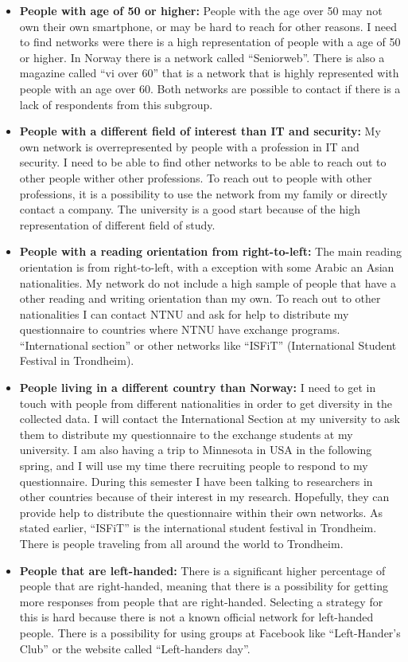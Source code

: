     \begin{itemize}
      \item {\bf People with age of 50 or higher:} People with the age over 50 may not own their own smartphone, or may be hard to reach for other reasons. I need to find networks were there is a high representation of people with a age of 50 or higher. In Norway there is a network called ``Seniorweb''. There is also a magazine called ``vi over 60'' that is a network that is highly represented with people with an age over 60. Both networks are possible to contact if there is a lack of respondents from this subgroup. 
      \item {\bf People with a different field of interest than IT and security:} My own network is overrepresented by people with a profession in IT and security. I need to be able to find other networks to be able to reach out to other people wither other professions. To reach out to people with other professions, it is a possibility to use the network from my family or directly contact a company. The university is a good start because of the high representation of different field of study. 
      \item {\bf People with a reading orientation from right-to-left:} The main reading orientation is from right-to-left, with a exception with some Arabic an Asian nationalities. My network do not include a high sample of people that have a other reading and writing orientation than my own. To reach out to other nationalities I can contact NTNU and ask for help to distribute my questionnaire to countries where NTNU have exchange programs. ``International section'' or other networks like ``ISFiT'' (International Student Festival in Trondheim). 
      \item {\bf People living in a different country than Norway:} I need to get in touch with people from different nationalities in order to get diversity in the collected data. I will contact the International Section at my university to ask them to distribute my questionnaire to the exchange students at my university. I am also having a trip to Minnesota in USA in the following spring, and I will use my time there recruiting people to respond to my questionnaire. During this semester I have been talking to researchers in other countries because of their interest in my research. Hopefully, they can provide help to distribute the questionnaire within their own networks. As stated earlier, ``ISFiT'' is the international student festival in Trondheim. There is people traveling from all around the world to Trondheim. 
      \item {\bf People that are left-handed:} There is a significant higher percentage of people that are right-handed, meaning that there is a possibility for getting more responses from people that are right-handed. Selecting a strategy for this is hard because there is not a known official network for left-handed people. There is a possibility for using groups at Facebook like ``Left-Hander's Club'' or the website called ``Left-handers day''. 
    \end{itemize}

